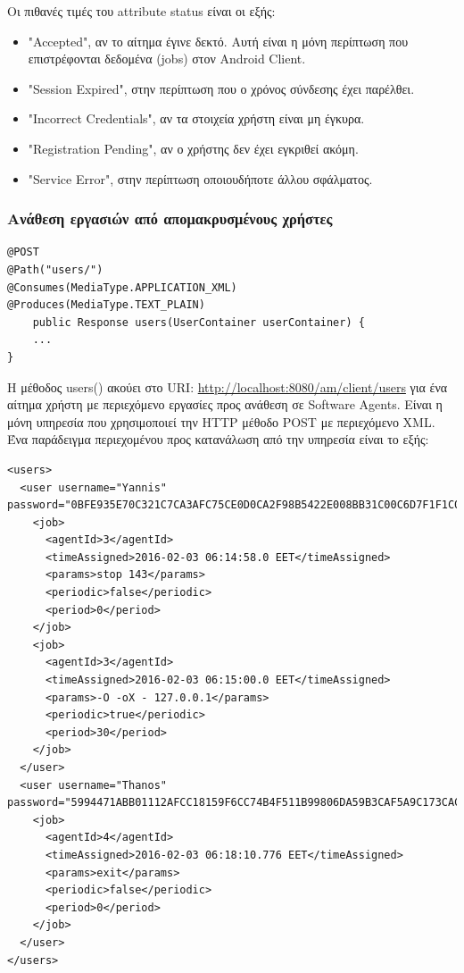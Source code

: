 \documentclass[a4paper,11pt]{article}
\begin{document}
\begin{sloppypar}
Οι πιθανές τιμές του attribute status είναι οι εξής:
\begin{itemize}
\item "Accepted", αν το αίτημα έγινε δεκτό. Αυτή είναι η μόνη περίπτωση που επιστρέφονται δεδομένα (jobs) στον Android Client.
\item "Session Expired", στην περίπτωση που ο χρόνος σύνδεσης έχει παρέλθει.
\item "Incorrect Credentials", αν τα στοιχεία χρήστη είναι μη έγκυρα.
\item "Registration Pending", αν ο χρήστης δεν έχει εγκριθεί ακόμη.
\item "Service Error", στην περίπτωση οποιουδήποτε άλλου σφάλματος.
\end{itemize}

\subsubsection{Ανάθεση εργασιών από απομακρυσμένους χρήστες}
\begin{lstlisting}
@POST
@Path("users/")
@Consumes(MediaType.APPLICATION_XML)
@Produces(MediaType.TEXT_PLAIN)
    public Response users(UserContainer userContainer) {
    ...
}
\end{lstlisting}
Η μέθοδος users() ακούει στο URI: \url{http://localhost:8080/am/client/users} για ένα αίτημα χρήστη με περιεχόμενο εργασίες προς ανάθεση σε Software Agents. Είναι η μόνη υπηρεσία που χρησιμοποιεί την HTTP μέθοδο POST με περιεχόμενο XML.
Ένα παράδειγμα περιεχομένου προς κατανάλωση από την υπηρεσία είναι το εξής:
\begin{lstlisting}
<users>
  <user username="Yannis"
password="0BFE935E70C321C7CA3AFC75CE0D0CA2F98B5422E008BB31C00C6D7F1F1C0AD6">
    <job>
      <agentId>3</agentId>
      <timeAssigned>2016-02-03 06:14:58.0 EET</timeAssigned>
      <params>stop 143</params>
      <periodic>false</periodic>
      <period>0</period>
    </job>
    <job>
      <agentId>3</agentId>
      <timeAssigned>2016-02-03 06:15:00.0 EET</timeAssigned>
      <params>-O -oX - 127.0.0.1</params>
      <periodic>true</periodic>
      <period>30</period>
    </job>
  </user>
  <user username="Thanos"
password="5994471ABB01112AFCC18159F6CC74B4F511B99806DA59B3CAF5A9C173CACFC5">
    <job>
      <agentId>4</agentId>
      <timeAssigned>2016-02-03 06:18:10.776 EET</timeAssigned>
      <params>exit</params>
      <periodic>false</periodic>
      <period>0</period>
    </job>
  </user>
</users>
\end{lstlisting}


\end{sloppypar}
\end{document}
